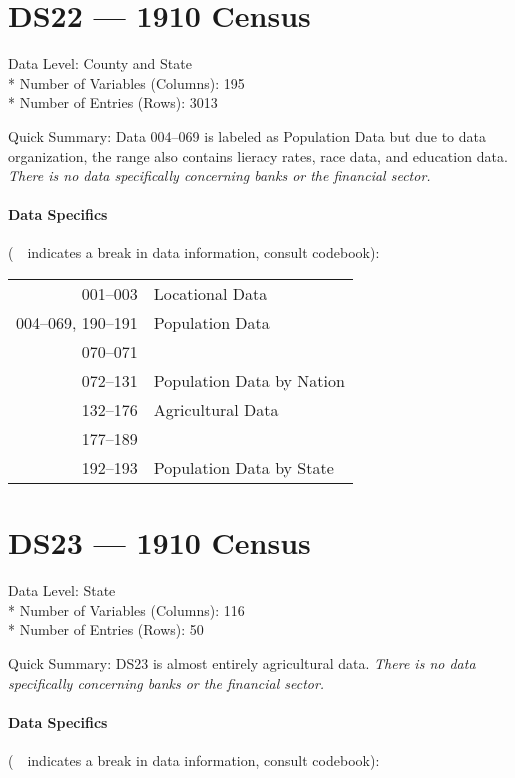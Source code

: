 ﻿\documentclass[12pt]{report}
\begin{document}
\section{DS22 --- 1910 Census}
	Data Level: County and State\\*
	Number of Variables (Columns): 195\\*
	Number of Entries (Rows): 3013
	\vspace{1.5em}
	
	\noindent Quick Summary: Data 004--069 is labeled as Population Data but due to data organization, the range also contains lieracy rates, race data, and education data. \textit{There is no data specifically concerning banks or the financial sector.}
	
	\paragraph{Data Specifics} (\guillemotleft~\guillemotright~indicates a break in data information, consult codebook):
	\vspace{1em}
	
	\begin{tabular}{r|l}
		001--003 & Locational Data\\
		004--069, 190--191 & Population Data\\
		070--071 & \guillemotleft~\guillemotright\\
		072--131 & Population Data by Nation\\
		132--176 & Agricultural Data\\
		177--189 & \guillemotleft~\guillemotright\\
		192--193 & Population Data by State
	\end{tabular}
	\newpage

\section{DS23 --- 1910 Census}
	Data Level: State\\*
	Number of Variables (Columns): 116\\*
	Number of Entries (Rows): 50
	\vspace{1.5em}
	
	\noindent Quick Summary: DS23 is almost entirely agricultural data. \textit{There is no data specifically concerning banks or the financial sector.}
	
	\paragraph{Data Specifics} (\guillemotleft~\guillemotright~indicates a break in data information, consult codebook):
	\vspace{1em}
	
\end{document}
